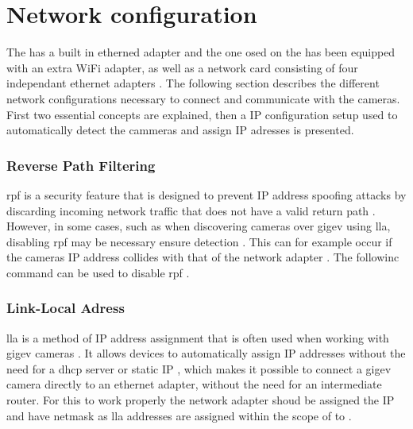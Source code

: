 \section{Network configuration}
The \jx has a built in etherned adapter and the one osed on the \sr has been equipped with an extra WiFi adapter, as well as a network card consisting of four independant ethernet adapters \cite{martensPortableSensorRig2022}.
The following section describes the different network configurations necessary to connect and communicate with the cameras.
First two essential concepts are explained, then a IP configuration setup used to automatically detect the cammeras and assign IP adresses is presented.


\subsubsection{Reverse Path Filtering}
\gls{rpf} is a security feature that is designed to prevent IP address spoofing attacks by discarding incoming network traffic that does not have a valid return path \cite{ReversePathFiltering}.
However, in some cases, such as when discovering cameras over \gls{gigev} using \gls{lla}, disabling \gls{rpf} may be necessary ensure detection \cite{lucidvisionlabsArenaSoftwareDevelopment2020}.
This can for example occur if the cameras IP address collides with that of the network adapter \cite{lucidvisionlabsArenaSoftwareDevelopment2020}.
The followinc command can be used to disable \gls{rpf} .

\subsubsection{Link-Local Adress}
\gls{lla} is a method of IP address assignment that is often used when working with \gls{gigev} cameras \cite{teledyneSettingIPAddress01} \cite{lucidvisionlabsArenaSoftwareDevelopment2020}.
It allows devices to automatically assign IP addresses without the need for a \gls{dhcp} server or static IP \cite{annieahujaweb2020LinkLocalAddress2022}, which makes it possible to connect a \gls{gigev} camera directly to an ethernet adapter, without the need for an intermediate router.
For this to work properly the network adapter shoud be assigned the IP  and have netmask  as \gls{lla} addresses are assigned within the scope of  to  \cite{annieahujaweb2020LinkLocalAddress2022}\cite{lucidvisionlabsArenaSoftwareDevelopment2020}.

